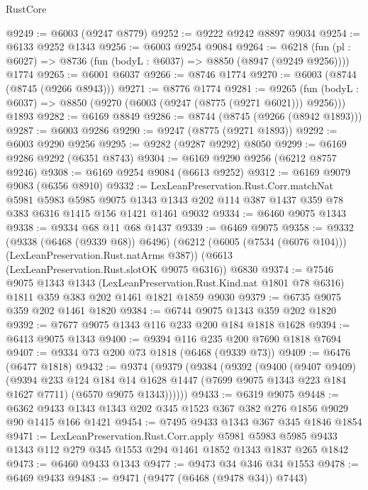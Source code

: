 \begin{lexlean}{RustCore}
\begin{coremodule}
@9249 := @6003 (@9247 @8779)
@9252 := @9222 @9242 @8897 @9034
@9254 := @6133 @9252 @1343
@9256 := @6003 @9254 @9084
@9264 := @6218
    (fun (pl : @6027) => @8736 (fun (bodyL : @6037) => @8850 (@8947 (@9249 @9256))))
    @1774
@9265 := @6001 @6037
@9266 := @8746 @1774
@9270 := @6003 (@8744 (@8745 (@9266 @8943)))
@9271 := @8776 @1774
@9281 := @9265
    (fun (bodyL : @6037) => @8850 (@9270 (@6003 (@9247 (@8775 (@9271 @6021))) @9256)))
    @1893
@9282 := @6169 @8849
@9286 := @8744 (@8745 (@9266 (@8942 @1893)))
@9287 := @6003 @9286
@9290 := @9247 (@8775 (@9271 @1893))
@9292 := @6003 @9290 @9256
@9295 := @9282 (@9287 @9292) @8050
@9299 := @6169 @9286 @9292 (@6351 @8743)
@9304 := @6169 @9290 @9256 (@6212 @8757 @9246)
@9308 := @6169 @9254 @9084 (@6613 @9252)
@9312 := @6169 @9079 @9083 (@6356 @8910)
@9332 := LexLeanPreservation.Rust.Corr.matchNat
    @5981
    @5983
    @5985
    @9075
    @1343
    @1343
    @202
    @114
    @387
    @1437
    @359
    @78
    @383
    @6316
    @1415
    @156
    @1421
    @1461
    @9032
@9334 := @6460 @9075 @1343
@9338 := @9334 @68 @11 @68 @1437
@9339 := @6469 @9075
@9358 := @9332
    (@9338 (@6468 (@9339 @68)) @6496)
    (@6212 (@6005 (@7534 (@6076 @104))) (LexLeanPreservation.Rust.natArms @387))
    (@6613 (LexLeanPreservation.Rust.slotOK @9075 @6316))
    @6830
@9374 := @7546
    @9075
    @1343
    @1343
    (LexLeanPreservation.Rust.Kind.nat @1801 @78 @6316)
    @1811
    @359
    @383
    @202
    @1461
    @1821
    @1859
    @9030
@9379 := @6735 @9075 @359 @202 @1461 @1820
@9384 := @6744 @9075 @1343 @359 @202 @1820
@9392 := @7677 @9075 @1343 @116 @233 @200 @184 @1818 @1628
@9394 := @6413 @9075 @1343
@9400 := @9394 @116 @235 @200 @7690 @1818 @7694
@9407 := @9334 @73 @200 @73 @1818 (@6468 (@9339 @73))
@9409 := @6476 (@6477 @1818)
@9432 := @9374
    (@9379
      (@9384
        (@9392
          (@9400
            (@9407 @9409)
            (@9394
              @233
              @124
              @184
              @14
              @1628
              @1447
              (@7699 @9075 @1343 @223 @184 @1627 @7711)
              (@6570 @9075 @1343))))))
@9433 := @6319 @9075
@9448 := @6362 @9433 @1343 @1343 @202 @345 @1523 @367 @382 @276 @1856 @9029 @90 @1415 @166 @1421
@9454 := @7495 @9433 @1343 @367 @345 @1846 @1854
@9471 := LexLeanPreservation.Rust.Corr.apply
    @5981
    @5983
    @5985
    @9433
    @1343
    @112
    @279
    @345
    @1553
    @294
    @1461
    @1852
    @1343
    @1837
    @265
    @1842
@9473 := @6460 @9433 @1343
@9477 := @9473 @34 @346 @34 @1553
@9478 := @6469 @9433
@9483 := @9471 (@9477 (@6468 (@9478 @34)) @7443)

\end{coremodule}
\end{lexlean}
